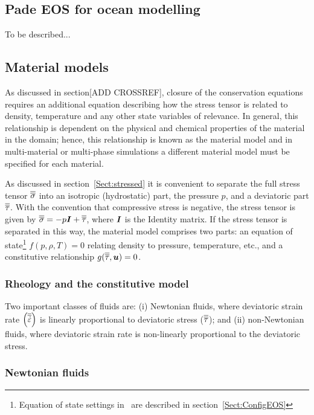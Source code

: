 \subsection{Pade EOS for ocean modelling}\label{Sect:PadeDescription}
To be described...

\subsection{Material models}

As discussed in section[ADD CROSSREF], closure of the conservation equations requires an additional equation describing how the stress tensor is related to density, temperature and any other state variables of relevance.  In general, this relationship is dependent on the physical and chemical properties of the material in the domain; hence, this relationship is known as the material model and in multi-material or multi-phase simulations a different material model must be specified for each material.

As discussed in section~\ref{Sect:stressed} it is convenient to separate the full stress tensor $\overline{\overline{\sigma}}$ into an isotropic (hydrostatic) part, the pressure $p$, and a deviatoric part $\overline{\overline{\tau}}$.  With the convention that compressive stress is negative, the stress tensor is given by $\overline{\overline{\sigma}} =-p {\mbox{\boldmath$I$}} + \overline{\overline{\tau}}$, where ${\mbox{\boldmath$I$}}$ is the Identity matrix. If the stress tensor is separated in this way, the material model comprises two parts: an equation of state\footnote{Equation of state settings in \fluidity\ are described in section~\ref{Sect:ConfigEOS}} $f(p,\rho,T)=0$ relating density to pressure, temperature, etc., and a constitutive relationship $g(\overline{\overline{\tau}},{\mbox{\boldmath$u$}})=0$.

\subsubsection{Rheology and the constitutive model}\label{Sect:Rheology}
Two important classes of fluids are: (i) Newtonian fluids, where deviatoric strain rate $\left(\overline{\overline{\dot{\varepsilon}}}\right)$ is linearly proportional to deviatoric stress ($\overline{\overline{\tau}}$); and (ii) non-Newtonian fluids, where deviatoric strain rate is non-linearly proportional to the deviatoric stress. 

\subsubsection{Newtonian fluids}

